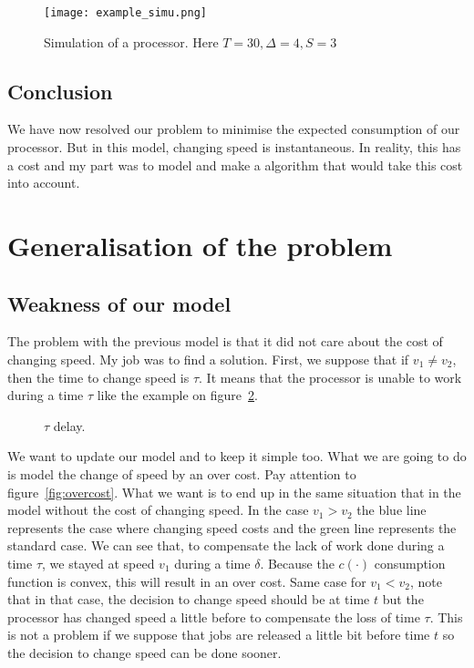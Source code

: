 \documentclass[
10pt, %
a4paper, %
oneside, %
headinclude,footinclude, %
BCOR5mm, %
]{scrartcl}
\begin{document}
\begin{figure}
  \centering
  \texttt{[image: example\_simu.png]}
  \caption{Simulation of a processor. Here $T=30,\Delta=4,S=3$}
  \label{fig:simu}
\end{figure}

\subsection{Conclusion}

We have now resolved our problem to minimise the expected consumption
of our processor. But in this model, changing speed is instantaneous. In
reality, this has a cost and my part was to model and make a algorithm
that would take this cost into account.

\section{Generalisation of the problem}

\subsection{Weakness of our model}


The problem with the previous model is that it did not care about the cost of
changing speed. My job was to find a solution. First, we suppose that if
$v_1\neq v_2$, then the time to change speed is $\tau$. It means that
the processor is unable to work during a time $\tau$ like the example
on figure~\ref{fig:delay}.
\begin{figure}
  \centering
  \caption{$\tau$ delay.}
  \label{fig:delay}
\end{figure}

We want to update our model and to keep it simple too. What we are
going to do is model the change of speed by an over cost. Pay attention
to figure~\ref{fig:overcost}. What we want is to end up in the same
situation that in the model without the cost of changing speed. In the
case $v_1>v_2$ the blue line represents the case where changing speed
costs and the green line represents the standard case. We can see
that, to compensate the lack of work done during a time
$\tau$, we stayed at
speed $v_1$ during a time $\delta$. Because the $c(\cdot)$ consumption function
is convex, this will result in an over cost. Same case for
$v_1<v_2$, note that in that case, the decision to change speed should be
at time $t$ but the processor has changed speed a little before to compensate
the loss of time $\tau$. This is not a problem if we suppose that jobs
are released a little bit before time $t$ so the decision to
change speed can be done sooner.
\end{document}
